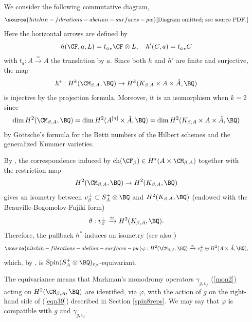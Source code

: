 We consider the following commutative diagram,
\begin{equation}\label{diagram1}
\source{hitchin-fibrations-abelian-surfaces-pw}
    \text{[Diagram omitted; see source PDF.]}
\end{equation}
Here the horizontal arrows are defined by
\[
h(\CF, a, L) = {t_a}_* \CF \otimes  L,\quad h'(C, a)= {t_a}_\ast C
\]
with $t_a: A \xrightarrow{\simeq} A$ the translation by $a$. Since both $h$ and $h'$ are finite and surjective, the map
\begin{equation*}
    h^*: H^k(\CM_{\beta, A}, \BQ) \to H^k(K_{\beta, A} \times A \times \hat{A}, \BQ)
\end{equation*}
is injective by the projection formula. Moreover, it is an isomorphism when $k=2$ since
\[
\mathrm{dim}\,H^2(\CM_{\beta,A}, \BQ) = \mathrm{dim}\,H^2(A^{[n]}\times \hat{A}, \BQ)= \mathrm{dim}\,H^2(K_{\beta, A} \times A \times \hat{A}, \BQ)
\]
by G\"ottsche's formula \cite{Go1} for the Betti numbers of the Hilbert schemes and the generalized Kummer varieties.

By \cite[Theorem 0.1 and (1.6)]{Yo}, the correspondence induced by $\mathrm{ch}(\CF_\beta) \in H^*(A \times \CM_{\beta,A})$ together with the restriction map
\[
H^2(\CM_{\beta,A}, \BQ) \to H^2(K_{\beta,A}, \BQ)
\]
gives an isometry between $v_\beta^\perp \subset S_A^+\otimes \BQ$ and $H^2(K_{\beta,A}, \BQ)$  (endowed with the Beauville-Bogomolov-Fujiki form)
\[
\theta: v_\beta^\perp  \xrightarrow{\simeq}  H^2(K_{\beta,A}, \BQ).
\]
{Therefore, the pullback $h^*$ induces an isometry
 (see also \cite[Theorem 4.1.(3) eq. (4.3)]{Yo})}
\begin{equation}\label{eqn39}
\source{hitchin-fibrations-abelian-surfaces-pw}
\varphi: H^2(\CM_{\beta, A}, \BQ) \xrightarrow{\simeq} v_\beta^\perp \oplus H^2(A\times \hat{A}, \BQ),
\end{equation}
which, by \cite[Section 8]{Markman2}, is  ${\rm Spin} (S_A^+\otimes \BQ)_{v_\beta}$-equivariant.
{
\begin{rmk}
\notready\label{compatibilityspin} The equivariance means  that
Markman's monodromy operators $\gamma_{g,v_\beta}$ (\ref{mon2}) acting on
$H^2(\CM_{\beta, A}, \BQ)$ are identified, via $\varphi$, with the action of $g$ on the
right-hand side of (\ref{eqn39})  described in Section \ref{spin8reps}. We may say that $\varphi$ is compatible with $g$ and $\gamma_{g,v_\beta}$.
\end{rmk}
}

